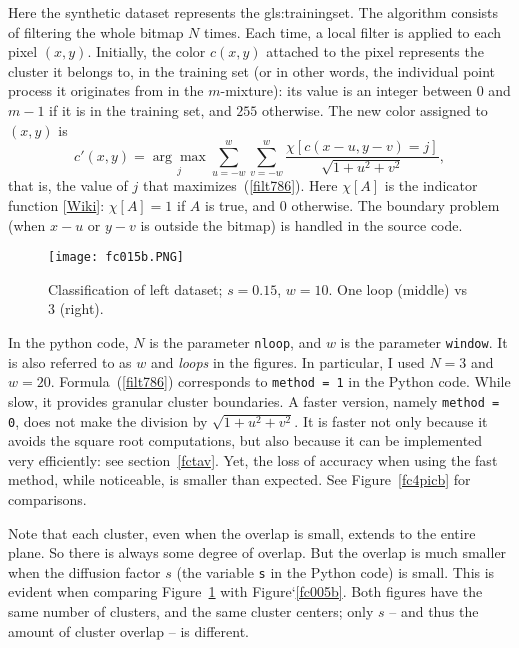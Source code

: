 \documentclass[oneside,10pt]{book}
\begin{document}
Here the synthetic dataset represents the \gls{gls:trainingset}. The algorithm consists of filtering the whole  bitmap $N$ times. 
Each time, a local filter is applied 
to each pixel $(x,y)$. Initially, the color $c(x,y)$ attached to the pixel represents the cluster it belongs to, in the training set (or in other words, the individual point process it originates from in the $m$-mixture): its value
is an integer between $0$ and $m-1$ if it is in the training set, and $255$ otherwise.  The new color assigned to $(x,y)$ is
\begin{equation}
c'(x,y)=\underset{j}{\arg \max} \sum_{u=-w}^{w}\sum_{v=-w}^{w}\frac{\chi[c(x-u,y-v)=j]}{\sqrt{1+u^2+v^2}}, \label{filt786}
\end{equation}
that is, the value of $j$ that maximizes~(\ref{filt786}). Here $\chi[A]$ is the indicator function [\href{https://en.wikipedia.org/wiki/Indicator_function}{Wiki}]: $\chi[A]=1$ if $A$ is true, and $0$ otherwise.
The boundary problem (when $x-u$ or $y-v$ is outside the bitmap) is handled in the source code. 

\begin{figure}[H]
\centering
\texttt{[image: fc015b.PNG]}
\caption{Classification of left dataset; $s=0.15$, $w=10$. One loop (middle) vs $3$ (right).}
\label{fc015b}
\end{figure}

In the python code, $N$ is the parameter \texttt{nloop}, and $w$ is the parameter
\texttt{window}. It is also referred to as $w$ and {\em loops} in the figures. In particular, I used $N=3$ and $w=20$. Formula~(\ref{filt786}) corresponds
to \texttt{method = 1} in the Python code. While slow, it provides granular cluster boundaries. A faster version, namely \texttt{method = 0}, does not make the division by
$\sqrt{1+u^2+v^2}$. It is faster not only because it avoids the square root computations, but also because it can be implemented very efficiently: 
see section~\ref{fctav}. Yet, the loss of accuracy when using the fast method, while noticeable, is smaller than expected.  See Figure~\ref{fc4picb} for comparisons.

Note that each cluster, even when the overlap is small, extends to the entire plane. So there is always some degree of overlap. But the overlap is much smaller when the diffusion 
factor $s$ (the variable \texttt{s} in the Python code) is small. This is evident when comparing Figure~\ref{fc015b} with Figure`\ref{fc005b}. Both figures have the same number
of clusters, and the same cluster centers; only $s$ -- and thus the amount of cluster overlap -- is different.
\end{document}
